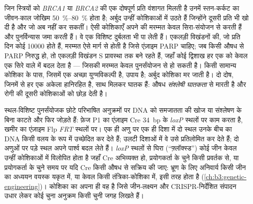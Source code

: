 \begin{example}\label{ex:b3:dna-repair:parp}
जिन स्त्रियों को \emph{BRCA1} या \emph{BRCA2} की एक दोषपूर्ण प्रति
वंशागत मिलती है उनमें स्तन-कर्कट का जीवन-काल जोखिम
\qtyrange{50}{80}{\%} होता है; अर्बुद उन्हीं कोशिकाओं में उठते हैं
जिन्होंने दूसरी प्रति भी खो दी है और जो अब  नहीं कर
सकतीं। ऐसी कोशिकाएँ अपने  की मरम्मत केवल सिरा-संयोजन
से करती हैं और पुनर्विन्यास जमा करती हैं। वे एक विशिष्ट दुर्बलता भी पा
लेती हैं। एकलड़ी विखंडनों की, जो प्रति दिन कोई \num{10000} होते हैं,
मरम्मत ऐसे मार्ग से होती है जिसे एंज़ाइम PARP चाहिए; जब किसी औषध से
PARP निरुद्ध हो, तो एकलड़ी विखंडन S प्रावस्था तक बने रहते हैं, जहाँ कोई
द्विशाख हर एक को केवल एक सिरे वाले  में बदल देता है ---
जिसकी मरम्मत केवल पुनर्संयोजन से हो सकती है। किसी सामान्य कोशिका के
पास, जिसमें एक अच्छा \emph{} युग्मविकल्पी है, उपाय है; अर्बुद
कोशिका मर जाती है। दो दोष, जिनमें से हर एक अकेला हानिरहित है, साथ
मिलकर घातक हैं: औषध \emph{संश्लेषी घातकता} से मारती है और रोगी की
दूसरी कोशिकाओं को छोड़ देती है।
\end{example}

\begin{proposition}[औज़ार के रूप में पुनर्संयोजन]\label{prop:b3:dna-repair:tools}
स्थल-विशिष्ट पुनर्संयोजक छोटे परिभाषित अनुक्रमों पर DNA को समजातता की
खोज या संश्लेषण के बिना काटते और फिर जोड़ते हैं: फ़ेज P1 का एंज़ाइम Cre
\qty{34}{bp} के \emph{loxP} स्थलों पर काम करता है, खमीर का एंज़ाइम Flp
\emph{FRT} स्थलों पर। एक ही अणु पर एक ही दिशा में दो स्थल उनके बीच का
DNA किसी वलय के रूप में उच्छेदित कर देते हैं; उलटी दिशाओं में वे उसे
प्रतिलोमित कर देते हैं; दो अणुओं पर पड़े स्थल अपने पार्श्व बदल लेते
हैं। \emph{loxP} स्थलों से घिरा (``फ़्लॉक्स्ड'') कोई जीन केवल उन्हीं
कोशिकाओं में विलोपित होता है जहाँ Cre अभिव्यक्त हो, प्रयोगकर्ता के चुने
किसी प्रवर्तक से, या प्रयोगकर्ता के चुने समय पर यदि Cre किसी औषध से
सक्रिय की जाए: भ्रूण के लिए अनिवार्य किसी जीन का अध्ययन वयस्क यकृत में,
या केवल किसी तंत्रिका-कोशिका में, इसी तरह होता है
(\cref{ch:b3:genetic-engineering})। कोशिका का अपना  ही
वह है जिसे जीन-लक्ष्यन और CRISPR-निर्देशित संपादन उधार लेकर कोई चुना
अनुक्रम किसी चुनी जगह लिखते हैं।
\end{proposition}

